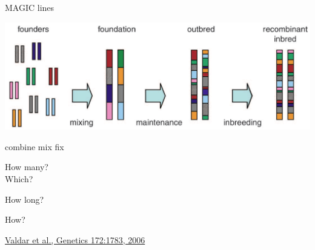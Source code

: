 \documentclass[12pt]{article}
\newcommand{\citesize}{\fontsize{14}{18} \selectfont}
\newcommand{\headsize}{\fontsize{35}{35} \selectfont}
\newcommand{\smallsize}{\fontsize{25}{30} \selectfont}
\newcommand{\smallersize}{\fontsize{20}{25} \selectfont}
\begin{document}
\newpage


\addtocounter{page}{-1}

\headsize \color{myyellow}
\hfill \begin{minipage}{5.75in}
\centering
MAGIC lines
\end{minipage}

\vspace{20mm}

\centerline{\includegraphics[width=10in]{Figs/valdar_genet2006.png}}

\smallsize \color{myyellow}
\hspace*{52mm} combine \hspace*{35mm} mix \hspace*{52mm} fix

\smallersize
\color{mywhite}
\vspace{20pt}

\hspace*{6mm}
\begin{minipage}[t]{45mm}
\vspace*{0mm}
\centering

How many? \\[20pt]
Which?
\end{minipage}
\hspace{57mm}
\begin{minipage}[t]{45mm}
\vspace*{0mm}
\centering

How long?
\end{minipage}
\hspace{18mm}
\begin{minipage}[t]{45mm}
\vspace*{0mm}
\centering

How?
\end{minipage}


\vfill

\hfill {\citesize \color{citecolor} \href{http://www.genetics.org/content/172/3/1783.full}{Valdar et al., Genetics 172:1783, 2006}}
\end{document}

